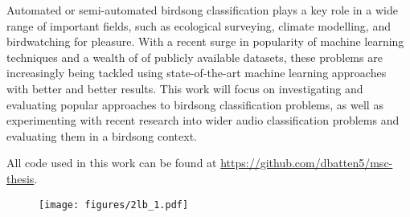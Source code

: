 Automated or semi-automated birdsong classification plays a key role in a
wide range of important fields, such as ecological surveying, climate modelling,
and birdwatching for pleasure. With a recent surge in popularity of machine
learning techniques and a wealth of of publicly available datasets, these
problems are increasingly being tackled using state-of-the-art machine learning
approaches with better and better results. This work will focus on investigating
and evaluating popular approaches to birdsong classification problems, as well
as experimenting with recent research into wider audio classification problems
and evaluating them in a birdsong context.

\begin{flushleft}
All code used in this work can be found at
\url{https://github.com/dbatten5/msc-thesis}.
\end{flushleft}

\begin{figure}[b]
  \centering
  \texttt{[image: figures/2lb\_1.pdf]}
\end{figure}
